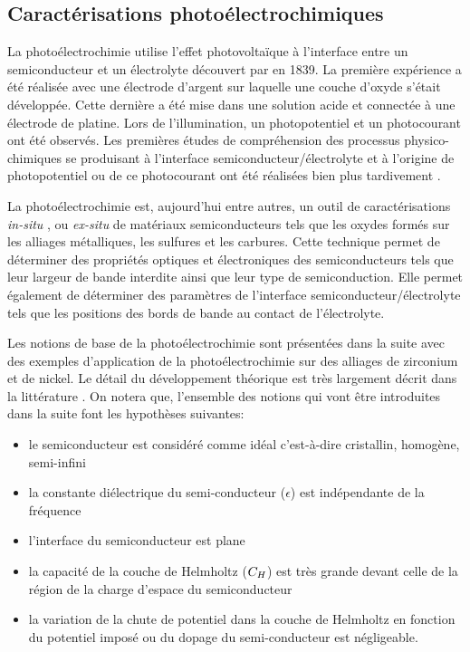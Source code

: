 \begin{refsection}
\section{Caractérisations photoélectrochimiques}\label{sec:state_of_art_PEC}
    
    La photoélectrochimie utilise l'effet photovoltaïque à l'interface entre un semiconducteur et un électrolyte découvert par
    \citet{Becquerel1839} en 1839. La première expérience a été réalisée avec une électrode d'argent sur laquelle une
    couche d'oxyde s'était développée. Cette dernière a été mise dans une solution acide et connectée à une électrode de
    platine. Lors de l'illumination, un photopotentiel et un photocourant ont été observés. Les premières études de
    compréhension des processus physico-chimiques se produisant à l'interface semiconducteur/électrolyte et à l'origine
    de photopotentiel ou de ce photocourant ont été réalisées bien plus tardivement 
    \citep{Gerischer1966, Copeland1942, Stimming1986}. 

    La photoélectrochimie est, aujourd'hui entre autres, un outil de caractérisations \emph{in-situ} \citep{Fujishima1972, Gratzel2001}, 
    ou \emph{ex-situ} \citep{Carpenter1989, Sunseri1995, Boschloo2001} de matériaux semiconducteurs tels que les oxydes
    formés sur les alliages métalliques, les sulfures et les carbures. Cette technique permet de déterminer des
    propriétés optiques et électroniques des semiconducteurs tels que leur largeur de bande interdite ainsi que leur
    type de semiconduction.
    Elle permet également de déterminer des paramètres de l'interface semiconducteur/électrolyte tels que les positions
    des bords de bande au contact de l'électrolyte. 
    
    Les notions de base de la photoélectrochimie sont présentées dans la suite avec des exemples d'application de la photoélectrochimie
    sur des alliages de zirconium et de nickel. Le détail du développement théorique est très largement décrit dans la
    littérature \citep{Marcus2006, Memming2008, Gerischer1985, Morrison1980, Bard2002, Sato1998}.
    On notera que, l'ensemble des notions qui vont être introduites dans la suite 
    font les hypothèses suivantes:
    \begin{itemize}
        \item le semiconducteur est considéré comme idéal c'est-à-dire cristallin, homogène, semi-infini
        \item la constante diélectrique du semi-conducteur ($\epsilon$) est indépendante de la fréquence
        \item l'interface du semiconducteur est plane
        \item la capacité de la couche de Helmholtz ($C_H$) est très grande devant celle de la région de la charge
        d'espace du semiconducteur
        \item la variation de la chute de potentiel dans la couche de Helmholtz en fonction du
        potentiel imposé ou du dopage du semi-conducteur est négligeable.
    \end{itemize}


\end{refsection}
